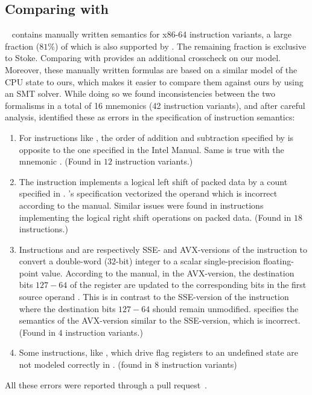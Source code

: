 \subsection{Comparing with \Stoke}
\Stoke~\cite{Stoke2013} contains manually written semantics for \stokeIS{} x86-64 instruction variants, a large fraction ($81\%$) of which is also supported by \Strata. The remaining fraction is exclusive to Stoke. Comparing with \Stoke provides an additional crosscheck on our model.  Moreover, these manually written formulas are based on a similar model of the CPU state to ours, which makes it easier to compare them against ours by using an SMT solver. While doing so we found inconsistencies between the two formalisms in a total of 16 mnemonics (42 instruction variants), and after careful analysis, identified these as errors in the \Stoke specification of instruction semantics:
\begin{enumerate}
    \item For instructions like  , the order of addition and subtraction specified by \Stoke is opposite to the one specified in the Intel Manual. Same is true with the mnemonic . (Found in $12$ instruction variants.)
    
    \item  The instruction  implements a logical left shift of packed data by a count specified in . \Stoke's specification vectorized the operand  which is incorrect according to the manual. Similar issues were found in instructions implementing the logical right shift operations on packed data. (Found in  $18$ instructions.)
    
    \item Instructions  and  are respectively SSE- and AVX-versions of the instruction to  convert a double-word ($32$-bit) integer to a scalar single-precision floating-point value. According to the manual, in the AVX-version,  the  destination bits $127-64$ of the  register  are updated to the corresponding bits in the first source operand . This  is in contrast to the SSE-version of the instruction where the destination bits $127-64$ should remain unmodified. \Stoke specifies the semantics of the AVX-version similar to the SSE-version, which is incorrect.  (Found in $4$ instruction variants.)
    
    \item Some instructions, like , which drive flag registers to an undefined state are not modeled correctly in \Stoke.    (found in $8$ instruction variants)  
\end{enumerate}
All these errors were reported through a pull request~\cite{Suppl}.

